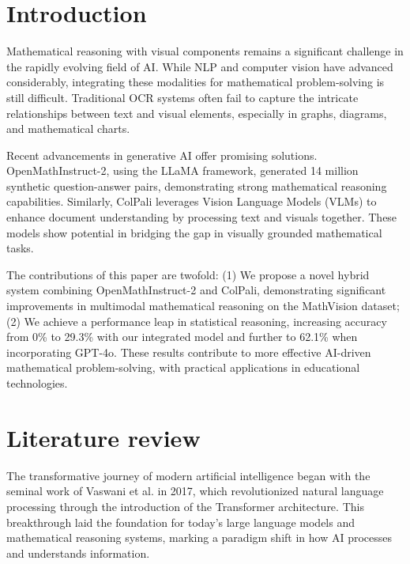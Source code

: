 \documentclass[a4paper,twoside,flushend, 10pt]{article}
\begin{document}
\maketitle
{}
\hspace{0.5cm}
\begin{minipage}[t]{13cm}
\section{Introduction}
Mathematical reasoning with visual components remains a significant challenge in the rapidly evolving field of AI. While NLP and computer vision have advanced considerably, integrating these modalities for mathematical problem-solving is still difficult. Traditional OCR systems often fail to capture the intricate relationships between text and visual elements, especially in graphs, diagrams, and mathematical charts.

Recent advancements in generative AI offer promising solutions. OpenMathInstruct-2\cite{TDM2024}, using the LLaMA framework\cite{DJP2024}, generated 14 million synthetic question-answer pairs, demonstrating strong mathematical reasoning capabilities. Similarly, ColPali\cite{FSW2024} leverages Vision Language Models (VLMs) to enhance document understanding by processing text and visuals together. These models show potential in bridging the gap in visually grounded mathematical tasks.

The contributions of this paper are twofold: (1) We propose a novel hybrid system combining OpenMathInstruct-2 and ColPali, demonstrating significant improvements in multimodal mathematical reasoning on the MathVision dataset\cite{WPS2024}; (2) We achieve a performance leap in statistical reasoning, increasing accuracy from 0\% to 29.3\% with our integrated model and further to 62.1\% when incorporating GPT-4o. These results contribute to more effective AI-driven mathematical problem-solving, with practical applications in educational technologies.


\end{minipage}
\newpage
\section{Literature review}
\noindent
The transformative journey of modern artificial intelligence began with the seminal work of Vaswani et al. \cite{VSP17} in 2017, which revolutionized natural language processing through the introduction of the Transformer architecture. This breakthrough laid the foundation for today's large language models and mathematical reasoning systems, marking a paradigm shift in how AI processes and understands information.
\end{document}
